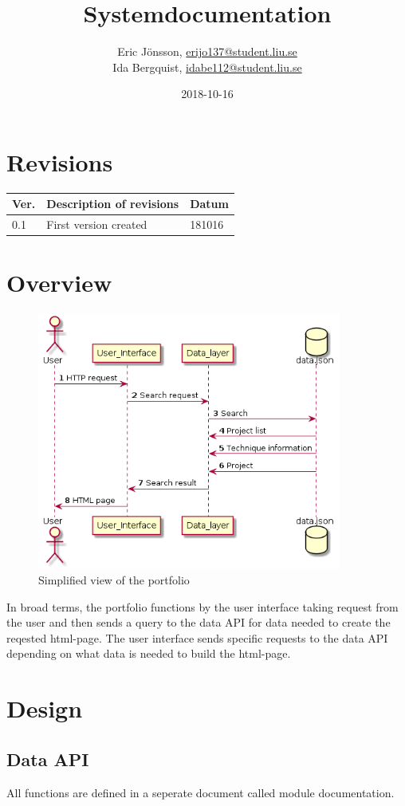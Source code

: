 \documentclass{TDP003mall}
\author{Eric Jönsson, \url{erijo137@student.liu.se}\\
  Ida Bergquist, \url{idabe112@student.liu.se}}
\title{Systemdocumentation}
\date{2018-10-16}
\begin{document}
\projectpage
\tableofcontents
\newpage
\section{Revisions}
\begin{table}[!h]
\begin{tabularx}{\linewidth}{|l|X|l|}
\hline
\textbf{Ver.} & \textbf{Description of revisions} & \textbf{Datum} \\\hline
0.1 & First version created & 181016 \\\hline
\end{tabularx}
\end{table}

\section{Overview}
\begin{figure}[h!]
    \centering
    \includegraphics[width=10cm]{sevenskdiagram.png}
    \caption{Simplified view of the portfolio}
    \label{sekvensdiagram}
\end{figure}
In broad terms, the portfolio functions by the user interface taking request from the user and then sends a query to the data API for data needed to create the reqested html-page.
The user interface sends specific requests to the data API depending on what data is needed to build the html-page.
\section{Design}
\subsection{Data API}
All functions are defined in a seperate document called module documentation.
\newpage
\end{document}

